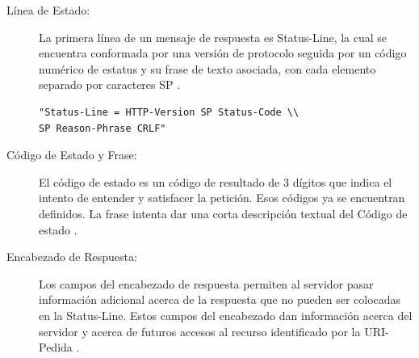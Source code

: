 \begin{description}

\item[Línea de Estado: ]
La primera línea de un mensaje de respuesta es Status-Line, la cual se encuentra conformada por una versión de protocolo seguida por un código numérico de estatus y su frase de texto asociada, con cada elemento separado por caracteres SP \cite{rfc2616}.

\begin{verbatim}
"Status-Line = HTTP-Version SP Status-Code \\ 
SP Reason-Phrase CRLF"
\end{verbatim}

\item[Código de Estado y Frase: ]
El código de estado es un código de resultado de 3 dígitos que indica el intento de entender y satisfacer la petición. Esos códigos ya se encuentran definidos. La frase intenta dar una corta descripción textual del Código de estado \cite{rfc2616}.

\item[Encabezado de Respuesta: ]
Los campos del encabezado de respuesta permiten al servidor pasar información adicional acerca de la respuesta que no pueden ser colocadas en la Status-Line. Estos campos del encabezado dan información acerca del servidor y acerca de futuros accesos al recurso identificado por la URI-Pedida \cite{rfc2616}.
\end{description}